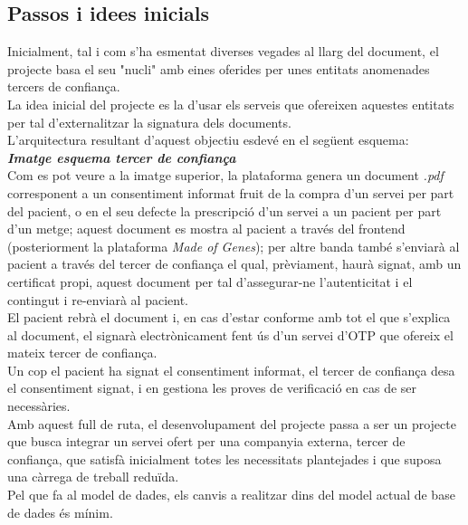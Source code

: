 \subsection{Passos i idees inicials}
Inicialment, tal i com s'ha esmentat diverses vegades al llarg del document, el projecte basa el seu "nucli" amb eines oferides per unes entitats anomenades tercers de confiança.\\
La idea inicial del projecte es la d'usar els serveis que ofereixen aquestes entitats per tal d'externalitzar la signatura dels documents.\\
\newline L'arquitectura resultant d'aquest objectiu esdevé en el següent esquema:\\
\newline \textbf{\textit{Imatge esquema tercer de confiança}}\\
\newline Com es pot veure a la imatge superior, la plataforma genera un document \textit{.pdf} corresponent a un consentiment informat fruit de la compra d'un servei per part del pacient, o en el seu defecte la prescripció d'un servei a un pacient per part d'un  metge; aquest document es mostra al pacient a través del frontend (posteriorment la plataforma \textit{Made of Genes}); per altre banda també s'enviarà al pacient a través del tercer de confiança el qual, prèviament, haurà signat, amb un certificat propi, aquest document per tal d'assegurar-ne l'autenticitat i el contingut i re-enviarà al pacient.\\
El pacient rebrà el document i, en cas d'estar conforme amb tot el que s'explica al document, el signarà electrònicament fent ús d'un servei d'OTP que ofereix el mateix tercer de confiança.
\\Un cop el pacient ha signat el consentiment informat, el tercer de confiança desa el consentiment signat, i en gestiona les proves de verificació en cas de ser necessàries.\\
\newline Amb aquest full de ruta, el desenvolupament del projecte passa a ser un projecte que busca integrar un servei ofert per una companyia externa, tercer de confiança, que satisfà inicialment totes les necessitats plantejades i que suposa una càrrega de treball reduïda.\\
\newline Pel que fa al model de dades, els canvis a realitzar dins del model actual de base de dades és mínim.\\
